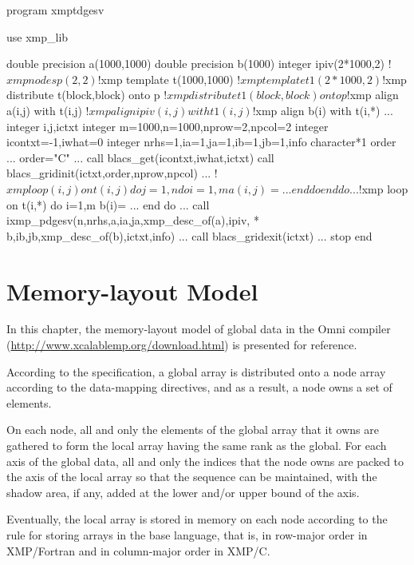 \begin{description}
\begin{XFexample}
      program xmptdgesv

      use xmp_lib

      double precision a(1000,1000)
      double precision b(1000)
      integer ipiv(2*1000,2)
!$xmp nodes p(2,2)
!$xmp template t(1000,1000)
!$xmp template t1(2*1000,2)
!$xmp distribute t(block,block) onto p
!$xmp distribute t1(block,block) onto p
!$xmp align a(i,j) with t(i,j)
!$xmp align ipiv(i,j) with t1(i,j)
!$xmp align b(i) with t(i,*)
      ...
      integer i,j,ictxt
      integer m=1000,n=1000,nprow=2,npcol=2
      integer icontxt=-1,iwhat=0
      integer nrhs=1,ia=1,ja=1,ib=1,jb=1,info
      character*1 order
      ...
      order="C"
      ...
      call blacs_get(icontxt,iwhat,ictxt)
      call blacs_gridinit(ictxt,order,nprow,npcol)
      ...
!$xmp loop (i,j) on t(i,j)
      do j=1,n
         do i=1,m
            a(i,j) = ...
         end do
      end do
      ...
!$xmp loop on t(i,*)
      do i=1,m
         b(i)= ...
      end do
      ...
      call ixmp_pdgesv(n,nrhs,a,ia,ja,xmp_desc_of(a),ipiv,
     *                b,ib,jb,xmp_desc_of(b),ictxt,info)
      ...
      call blacs_gridexit(ictxt)
      ...
      stop
      end
\end{XFexample}
\end{description}


\chapter{Memory-layout Model}
\label{155445_16Jan17}

In this chapter, the memory-layout model of global data in the Omni
{\XMP} compiler (\url{http://www.xcalablemp.org/download.html}) is
presented for reference.

According to the {\XMP} specification, a global array is distributed onto
a node array according to the data-mapping directives, and as a
result, a node owns a set of elements.

On each node, all and only the elements of the global array that it
owns are gathered to form the local array having the same rank as the
global. For each axis of the global data, all and only the indices 
that the node owns are packed to the axis of the local array so that
the sequence can be maintained, with the shadow area, if any, added at the
lower and/or upper bound of the axis.

Eventually, the local array is stored in memory on each node according
to the rule for storing arrays in the base language, that is, in
row-major order in XMP/Fortran and in column-major order in XMP/C.

